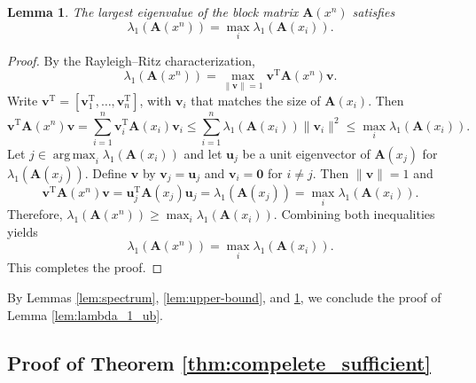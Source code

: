 \documentclass{article} %
\DeclareMathOperator*{\argmax}{arg\,max}
\theoremstyle{plain} %
\newtheorem{lemma}[theorem]{Lemma}          %
\begin{document}
\begin{lemma}\label{lem:block}
The largest eigenvalue of the block matrix $\textbf{A}(x^n)$ satisfies
\[
\lambda_1(\textbf{A}(x^n)) = \max_i \lambda_1(\textbf{A}(x_i)).
\]
\end{lemma}
\begin{proof}
By the Rayleigh–Ritz characterization,
\begin{equation*}
    \lambda_1(\textbf{A}(x^n)) = \max_{\|\bm{v}\|=1} \bm{v}^\text{T} \textbf{A}(x^n)\bm{v}.
\end{equation*}
Write $\bm{v}^\text{T} = [\bm{v}_1^\text{T},\dots, \bm{v}_n^\text{T}]$, with $\bm{v}_i$ that matches the size of $\textbf{A}(x_i)$. Then
\begin{equation*}
    \bm{v}^\text{T}\textbf{A}(x^n)\bm{v} = \sum_{i=1}^n \bm{v}_i^\text{T} \textbf{A}(x_i)\bm{v}_i \leq \sum_{i=1}^n\lambda_1(\textbf{A}(x_i)) \| \bm{v}_i\|^2 \leq \max_i \lambda_1(\textbf{A}(x_i)).
\end{equation*}
Let $j\in\argmax_i \lambda_1(\textbf{A}(x_i))$ and let $\bm{u}_j$ be a unit eigenvector of $\textbf{A}(x_j)$ for $\lambda_1(\textbf{A}(x_j))$. Define $\bm{v}$ by $\bm{v}_j=\bm{u}_j$ and $\bm{v}_i=\bm{0}$ for $i\neq j$. Then $\|\bm{v}\|=1$ and
\begin{equation*}
    \bm{v}^\text{T}\textbf{A}(x^n)\bm{v} = \bm{u}_j^\text{T}\textbf{A}(x_j)\bm{u}_j =\lambda_1(\textbf{A}(x_j))= \max_i \lambda_1(\textbf{A}(x_i)).
\end{equation*}
Therefore, $\lambda_1(\textbf{A}(x^n)) \geq \max_i \lambda_1(\textbf{A}(x_i)).$ Combining both inequalities yields
\begin{equation*}
    \lambda_1(\textbf{A}(x^n)) = \max_i \lambda_1(\textbf{A}(x_i)).
\end{equation*}
This completes the proof.
\end{proof}

By Lemmas \ref{lem:spectrum}, \ref{lem:upper-bound}, and \ref{lem:block}, we conclude the proof of Lemma \ref{lem:lambda_1_ub}.

\subsection{Proof of Theorem \ref{thm:compelete_sufficient}}\label{append:theorem1_proof}
\end{document}
